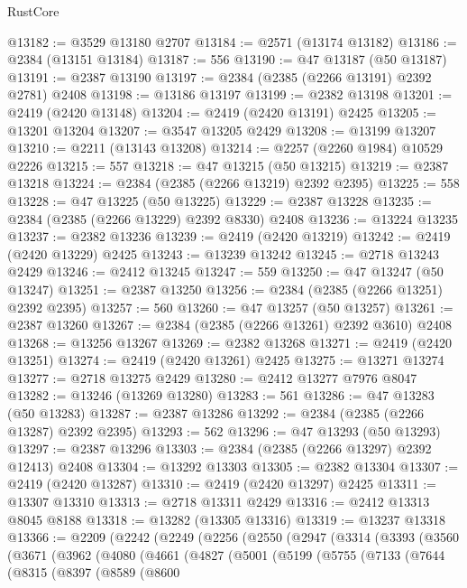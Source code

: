 \begin{lexlean}{RustCore}
\begin{coremodule}
@13182 := @3529 @13180 @2707
@13184 := @2571 (@13174 @13182)
@13186 := @2384 (@13151 @13184)
@13187 := 556
@13190 := @47 @13187 (@50 @13187)
@13191 := @2387 @13190
@13197 := @2384 (@2385 (@2266 @13191) @2392 @2781) @2408
@13198 := @13186 @13197
@13199 := @2382 @13198
@13201 := @2419 (@2420 @13148)
@13204 := @2419 (@2420 @13191) @2425
@13205 := @13201 @13204
@13207 := @3547 @13205 @2429
@13208 := @13199 @13207
@13210 := @2211 (@13143 @13208)
@13214 := @2257 (@2260 @1984) @10529 @2226
@13215 := 557
@13218 := @47 @13215 (@50 @13215)
@13219 := @2387 @13218
@13224 := @2384 (@2385 (@2266 @13219) @2392 @2395)
@13225 := 558
@13228 := @47 @13225 (@50 @13225)
@13229 := @2387 @13228
@13235 := @2384 (@2385 (@2266 @13229) @2392 @8330) @2408
@13236 := @13224 @13235
@13237 := @2382 @13236
@13239 := @2419 (@2420 @13219)
@13242 := @2419 (@2420 @13229) @2425
@13243 := @13239 @13242
@13245 := @2718 @13243 @2429
@13246 := @2412 @13245
@13247 := 559
@13250 := @47 @13247 (@50 @13247)
@13251 := @2387 @13250
@13256 := @2384 (@2385 (@2266 @13251) @2392 @2395)
@13257 := 560
@13260 := @47 @13257 (@50 @13257)
@13261 := @2387 @13260
@13267 := @2384 (@2385 (@2266 @13261) @2392 @3610) @2408
@13268 := @13256 @13267
@13269 := @2382 @13268
@13271 := @2419 (@2420 @13251)
@13274 := @2419 (@2420 @13261) @2425
@13275 := @13271 @13274
@13277 := @2718 @13275 @2429
@13280 := @2412 @13277 @7976 @8047
@13282 := @13246 (@13269 @13280)
@13283 := 561
@13286 := @47 @13283 (@50 @13283)
@13287 := @2387 @13286
@13292 := @2384 (@2385 (@2266 @13287) @2392 @2395)
@13293 := 562
@13296 := @47 @13293 (@50 @13293)
@13297 := @2387 @13296
@13303 := @2384 (@2385 (@2266 @13297) @2392 @12413) @2408
@13304 := @13292 @13303
@13305 := @2382 @13304
@13307 := @2419 (@2420 @13287)
@13310 := @2419 (@2420 @13297) @2425
@13311 := @13307 @13310
@13313 := @2718 @13311 @2429
@13316 := @2412 @13313 @8045 @8188
@13318 := @13282 (@13305 @13316)
@13319 := @13237 @13318
@13366 := @2209
    (@2242
      (@2249
        (@2256
          (@2550
            (@2947
              (@3314
                (@3393
                  (@3560
                    (@3671
                      (@3962
                        (@4080
                          (@4661
                            (@4827
                              (@5001
                                (@5199
                                  (@5755
                                    (@7133
                                      (@7644
                                        (@8315
                                          (@8397
                                            (@8589
                                              (@8600

\end{coremodule}
\end{lexlean}
